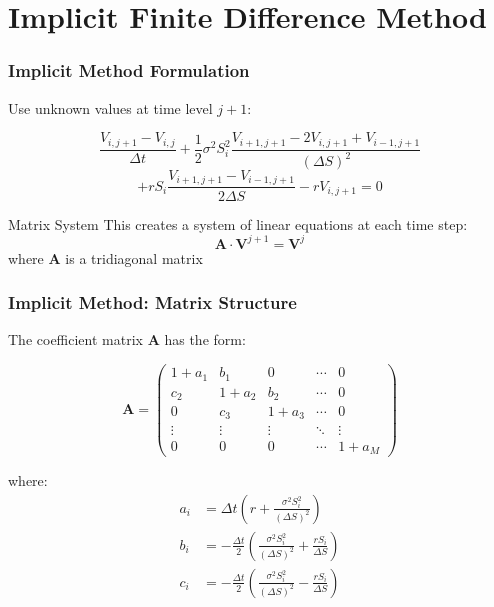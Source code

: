 \documentclass{beamer}
\begin{document}
\section{Implicit Finite Difference Method}

\begin{frame}
\frametitle{Implicit Method Formulation}
Use unknown values at time level $j+1$:

$$\frac{V_{i,j+1} - V_{i,j}}{\Delta t} + \frac{1}{2}\sigma^2 S_i^2 \frac{V_{i+1,j+1} - 2V_{i,j+1} + V_{i-1,j+1}}{(\Delta S)^2}$$
$$+ rS_i \frac{V_{i+1,j+1} - V_{i-1,j+1}}{2\Delta S} - rV_{i,j+1} = 0$$

\begin{block}{Matrix System}
This creates a system of linear equations at each time step:
$$\mathbf{A} \cdot \mathbf{V}^{j+1} = \mathbf{V}^j$$
where $\mathbf{A}$ is a tridiagonal matrix
\end{block}
\end{frame}

\begin{frame}
\frametitle{Implicit Method: Matrix Structure}
The coefficient matrix $\mathbf{A}$ has the form:

$$\mathbf{A} = \begin{pmatrix}
1+a_1 & b_1 & 0 & \cdots & 0 \\
c_2 & 1+a_2 & b_2 & \cdots & 0 \\
0 & c_3 & 1+a_3 & \cdots & 0 \\
\vdots & \vdots & \vdots & \ddots & \vdots \\
0 & 0 & 0 & \cdots & 1+a_M
\end{pmatrix}$$

where:
\begin{align}
a_i &= \Delta t \left( r + \frac{\sigma^2 S_i^2}{(\Delta S)^2} \right) \\
b_i &= -\frac{\Delta t}{2} \left( \frac{\sigma^2 S_i^2}{(\Delta S)^2} + \frac{rS_i}{\Delta S} \right) \\
c_i &= -\frac{\Delta t}{2} \left( \frac{\sigma^2 S_i^2}{(\Delta S)^2} - \frac{rS_i}{\Delta S} \right)
\end{align}
\end{frame}
\end{document}
